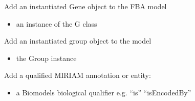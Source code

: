 \documentclass[letterpaper,10pt,english]{sphinxmanual}
\begin{document}
\begin{fulllineitems}
\begin{fulllineitems}
\begin{itemize}
\end{itemize}

\end{fulllineitems}


\begin{fulllineitems}
\label{\detokenize{modules_doc:cbmpy.CBModel.Model.addGene}}
\pysigstartsignatures
{}
\pysigstopsignatures
\sphinxAtStartPar
Add an instantiated Gene object to the FBA model
\begin{itemize}
\item {} 
\sphinxAtStartPar
{} an instance of the G class

\end{itemize}

\end{fulllineitems}


\begin{fulllineitems}
\label{\detokenize{modules_doc:cbmpy.CBModel.Model.addGroup}}
\pysigstartsignatures
{}
\pysigstopsignatures
\sphinxAtStartPar
Add an instantiated group object to the model
\begin{itemize}
\item {} 
\sphinxAtStartPar
{} the Group instance

\end{itemize}

\end{fulllineitems}


\begin{fulllineitems}
\label{\detokenize{modules_doc:cbmpy.CBModel.Model.addMIRIAMannotation}}
\pysigstartsignatures
{}
\pysigstopsignatures
\sphinxAtStartPar
Add a qualified MIRIAM annotation or entity:
\begin{itemize}
\item {} 
\sphinxAtStartPar
{} a Biomodels biological qualifier e.g. “is” “isEncodedBy”


\end{itemize}
\end{fulllineitems}
\end{fulllineitems}
\end{document}
